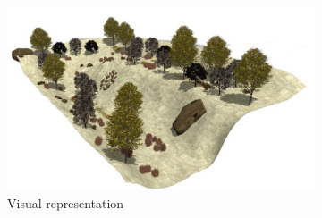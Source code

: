 \documentclass[runningheads]{llncs}
\begin{document}
\begin{figure}[ht]
    \centering
    \begin{subfigure}[b]{0.6\linewidth}
        \centering
        \includegraphics[width=\linewidth]{img/Rugged_Hillside_vis.png}
        \caption{Visual representation}
        \label{fig:subfig1}
    \end{subfigure}
    \hfill
    \begin{subfigure}[b]{0.3\linewidth}
        \centering

\end{subfigure}
\end{figure}
\end{document}
